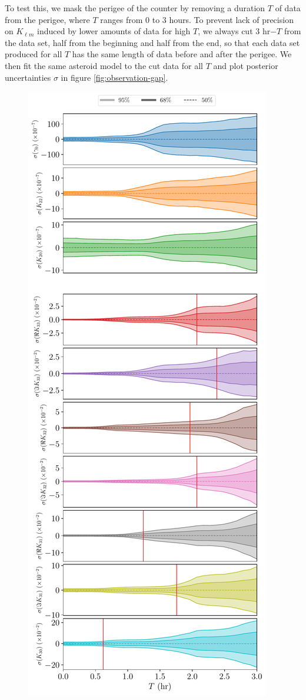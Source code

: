 \documentclass[fleqn,usenatbib]{mnras}
\begin{document}
To test this, we mask the perigee of the counter by removing a duration $T$ of data from the perigee, where $T$ ranges from 0 to 3 hours. To prevent lack of precision on $K_{\ell m}$ induced by lower amounts of data for high $T$, we always cut 3 hr$-T$ from the data set, half from the beginning and half from the end, so that each data set produced for all $T$ has the same length of data before and after the perigee. We then fit the same asteroid model to the cut data for all $T$ and plot posterior uncertainties $\sigma$ in figure \ref{fig:observation-gap}.

\begin{figure}
  \centering
  \includegraphics[height=0.89\textheight]{figs/observation-gap.pdf}

\end{figure}
\end{document}
